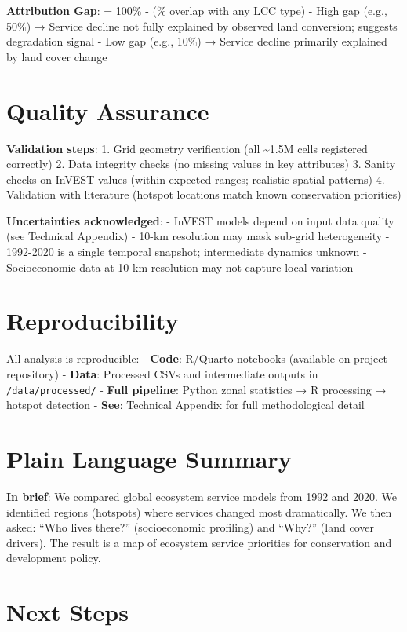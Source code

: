 \documentclass[
  letterpaper,
  DIV=11,
  numbers=noendperiod]{scrreprt}
\begin{document}
\textbf{Attribution Gap}: = 100\% - (\% overlap with any LCC type) -
High gap (e.g., 50\%) → Service decline not fully explained by observed
land conversion; suggests degradation signal - Low gap (e.g., 10\%) →
Service decline primarily explained by land cover change

\section{Quality Assurance}\label{quality-assurance}

\textbf{Validation steps}: 1. Grid geometry verification (all
\textasciitilde1.5M cells registered correctly) 2. Data integrity checks
(no missing values in key attributes) 3. Sanity checks on InVEST values
(within expected ranges; realistic spatial patterns) 4. Validation with
literature (hotspot locations match known conservation priorities)

\textbf{Uncertainties acknowledged}: - InVEST models depend on input
data quality (see Technical Appendix) - 10-km resolution may mask
sub-grid heterogeneity - 1992-2020 is a single temporal snapshot;
intermediate dynamics unknown - Socioeconomic data at 10-km resolution
may not capture local variation

\section{Reproducibility}\label{reproducibility}

All analysis is reproducible: - \textbf{Code}: R/Quarto notebooks
(available on project repository) - \textbf{Data}: Processed CSVs and
intermediate outputs in \texttt{/data/processed/} - \textbf{Full
pipeline}: Python zonal statistics → R processing → hotspot detection -
\textbf{See}: Technical Appendix for full methodological detail

\section{Plain Language Summary}\label{plain-language-summary}

\textbf{In brief}: We compared global ecosystem service models from 1992
and 2020. We identified regions (hotspots) where services changed most
dramatically. We then asked: ``Who lives there?'' (socioeconomic
profiling) and ``Why?'' (land cover drivers). The result is a map of
ecosystem service priorities for conservation and development policy.

\section{Next Steps}\label{next-steps}
\end{document}
